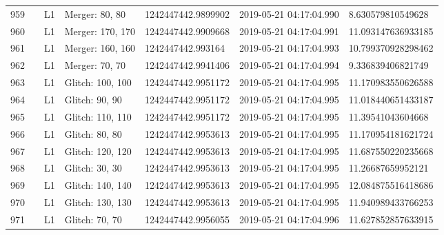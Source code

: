 \begin{longtable}{lllllll}
959  &                                                    &       L1 &    Merger: 80, 80 &  1242447442.9899902 &  2019-05-21 04:17:04.990 &   8.630579810549628 \\
960  &                                                    &       L1 &  Merger: 170, 170 &  1242447442.9909668 &  2019-05-21 04:17:04.991 &  11.093147636933185 \\
961  &                                                    &       L1 &  Merger: 160, 160 &   1242447442.993164 &  2019-05-21 04:17:04.993 &  10.799370928298462 \\
962  &                                                    &       L1 &    Merger: 70, 70 &  1242447442.9941406 &  2019-05-21 04:17:04.994 &   9.336839406821749 \\
963  &                                                    &       L1 &  Glitch: 100, 100 &  1242447442.9951172 &  2019-05-21 04:17:04.995 &  11.170983550626588 \\
964  &                                                    &       L1 &    Glitch: 90, 90 &  1242447442.9951172 &  2019-05-21 04:17:04.995 &  11.018440651433187 \\
965  &                                                    &       L1 &  Glitch: 110, 110 &  1242447442.9951172 &  2019-05-21 04:17:04.995 &   11.39541043604668 \\
966  &                                                    &       L1 &    Glitch: 80, 80 &  1242447442.9953613 &  2019-05-21 04:17:04.995 &  11.170954181621724 \\
967  &                                                    &       L1 &  Glitch: 120, 120 &  1242447442.9953613 &  2019-05-21 04:17:04.995 &  11.687550220235668 \\
968  &                                                    &       L1 &    Glitch: 30, 30 &  1242447442.9953613 &  2019-05-21 04:17:04.995 &   11.26687659952121 \\
969  &                                                    &       L1 &  Glitch: 140, 140 &  1242447442.9953613 &  2019-05-21 04:17:04.995 &  12.084875516418686 \\
970  &                                                    &       L1 &  Glitch: 130, 130 &  1242447442.9953613 &  2019-05-21 04:17:04.995 &  11.940989433766253 \\
971  &                                                    &       L1 &    Glitch: 70, 70 &  1242447442.9956055 &  2019-05-21 04:17:04.996 &  11.627852857633915 \\

\end{longtable}
